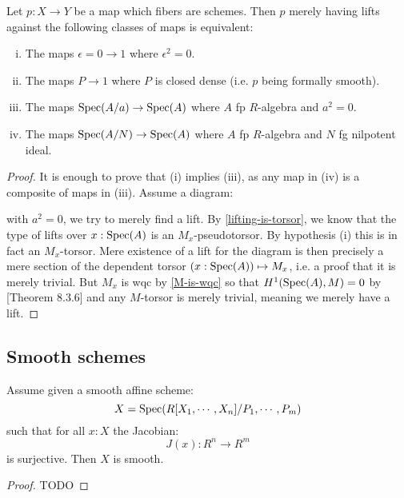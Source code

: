 \begin{proposition}
Let $p:X\to Y$ be a map which fibers are schemes. Then $p$ merely having lifts against the following classes of maps is equivalent:
\begin{enumerate}[(i)]
\item The maps $\epsilon=0\to 1$ where $\epsilon^2=0$.
\item The maps $P\to 1$ where $P$ is closed dense (i.e. $p$ being formally smooth).
\item The maps $\operatorname{Spec}(A/a)\to \operatorname{Spec}(A)$ where $A$ fp $R$-algebra and $a^2=0$.
\item The maps $\operatorname{Spec}(A/N)\to \operatorname{Spec}(A)$ where $A$ fp $R$-algebra and $N$ fg nilpotent ideal.
\end{enumerate}
\end{proposition}

\begin{proof}
It is enough to prove that (i) implies (iii), as any map in (iv) is a composite of maps in (iii). Assume a diagram:
 \begin{center}
    \end{center} 
    with $a^2=0$, we try to merely find a lift. By \cref{lifting-is-torsor}, we know that the type of lifts over $x:\operatorname{Spec}(A)$ is an $M_x$-pseudotorsor. By hypothesis (i) this is in fact an $M_x$-torsor. Mere existence of a lift for the diagram is then precisely a mere section of the dependent torsor $(x:\operatorname{Spec}(A))\mapsto M_x$, i.e. a proof that it is merely trivial. But $M_x$ is wqc by \cref{M-is-wqc} so that $H^1(\operatorname{Spec}(A),M)=0$ by \cite{draft}[Theorem 8.3.6] and any $M$-torsor is merely trivial, meaning we merely have a lift.
\end{proof}

\subsection{Smooth schemes}

\begin{lemma}
Assume given a smooth affine scheme:
\[X = \operatorname{Spec}(R[X_1,\cdots,X_n]/P_1,\cdots,P_m)\]
such that for all $x:X$ the Jacobian:
\[J(x) : R^n \to R^m\]
is surjective. Then $X$ is smooth.
\end{lemma}

\begin{proof}
TODO
\end{proof}

